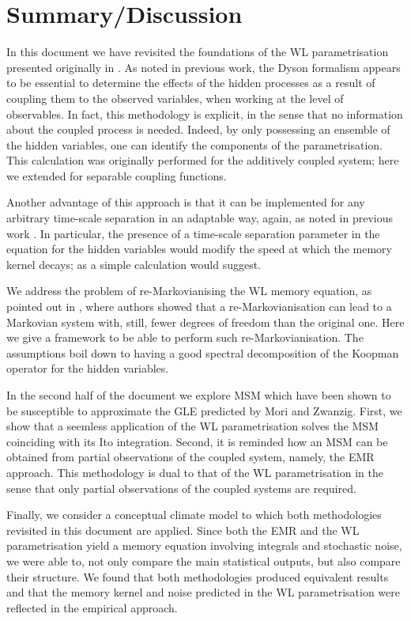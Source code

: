 \documentclass[12pt]{article}
\begin{document}
\section*{Summary/Discussion}

In this document we have revisited the foundations of the WL parametrisation presented originally in  \cite{Wouters2012, wouters2013}. As noted in previous work, the Dyson formalism appears to be essential to determine the effects of the hidden processes as a result of coupling them to the observed variables, when working at the level of observables. In fact, this methodology is explicit, in the sense that no information about the coupled process is needed. Indeed, by only possessing an ensemble of the hidden variables, one can identify the components of the parametrisation. This calculation was originally performed for the additively coupled system; here we extended for separable coupling functions.

Another advantage of this approach is that it can be implemented for any arbitrary time-scale separation in an adaptable way, again, as noted in previous work \cite{Vissio2018a}. In particular, the presence of a time-scale separation parameter in the equation for the hidden variables would modify the speed at which the memory kernel decays; as a simple calculation would suggest.

We address the problem of re-Markovianising the WL memory equation, as pointed out in \cite{Wouters2016}, where authors showed that a re-Markovianisation can lead to a Markovian system with, still, fewer degrees of freedom than the original one. Here we give a framework to be able to perform such re-Markovianisation. The assumptions boil down to having a good spectral decomposition of the Koopman operator for the hidden variables.

In the second half of the document we explore MSM which have been shown to be susceptible to approximate the GLE predicted by Mori and Zwanzig. First, we show that a seemless application of the WL parametrisation solves the MSM coinciding with its Ito integration. Second, it is reminded how an MSM can be obtained from partial observations of the coupled system, namely, the EMR approach. This methodology is dual to that of the WL parametrisation in the sense that only partial observations of the coupled systems are required.

Finally, we consider a conceptual climate model to which both methodologies revisited in this document are applied. Since both the EMR and the WL parametrisation yield a memory equation involving integrals and stochastic noise, we were able to, not only compare the main statistical outputs, but also compare their structure. We found that both methodologies produced equivalent results and that the memory kernel and noise predicted in the WL parametrisation were reflected in the empirical approach.
\end{document}
